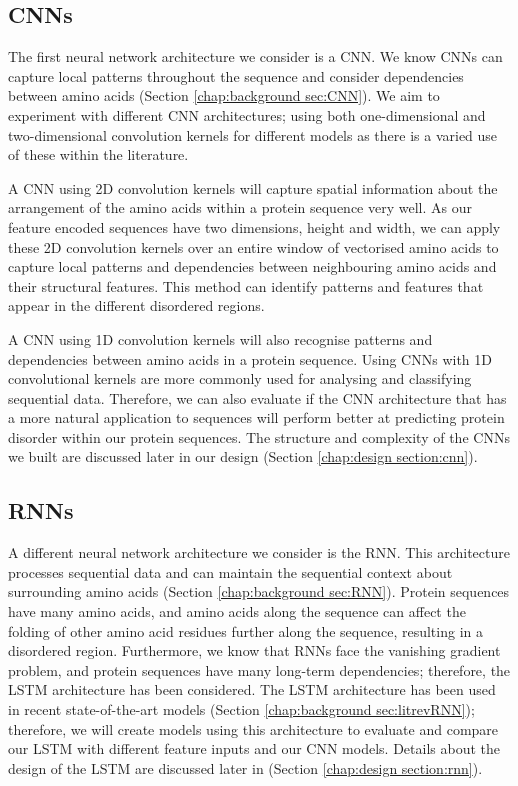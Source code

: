 \documentclass{l4proj}
\begin{document}
\subsection*{CNNs}

The first neural network architecture we consider is a CNN. We know CNNs can capture local patterns throughout the sequence and consider dependencies between amino acids (Section \ref{chap:background sec:CNN}). We aim to experiment with different CNN architectures; using both one-dimensional and two-dimensional convolution kernels for different models as there is a varied use of these within the literature.

A CNN using 2D convolution kernels will capture spatial information about the arrangement of the amino acids within a protein sequence very well. As our feature encoded sequences have two dimensions, height and width, we can apply these 2D convolution kernels over an entire window of vectorised amino acids to capture local patterns and dependencies between neighbouring amino acids and their structural features. This method can identify patterns and features that appear in the different disordered regions.

A CNN using 1D convolution kernels will also recognise patterns and dependencies between amino acids in a protein sequence. Using CNNs with 1D convolutional kernels are more commonly used for analysing and classifying sequential data. Therefore, we can also evaluate if the CNN architecture that has a more natural application to sequences will perform better at predicting protein disorder within our protein sequences. The structure and complexity of the CNNs we built are discussed later in our design (Section \ref{chap:design section:cnn}). 

\subsection*{RNNs}

A different neural network architecture we consider is the RNN. This architecture processes sequential data and can maintain the sequential context about surrounding amino acids (Section \ref{chap:background sec:RNN}). Protein sequences have many amino acids, and amino acids along the sequence can affect the folding of other amino acid residues further along the sequence, resulting in a disordered region. Furthermore, we know that RNNs face the vanishing gradient problem, and protein sequences have many long-term dependencies; therefore, the LSTM architecture has been considered. The LSTM architecture has been used in recent state-of-the-art models (Section \ref{chap:background sec:litrevRNN}); therefore, we will create models using this architecture to evaluate and compare our LSTM with different feature inputs and our CNN models. Details about the design of the LSTM are discussed later in (Section \ref{chap:design section:rnn}).
\end{document}
